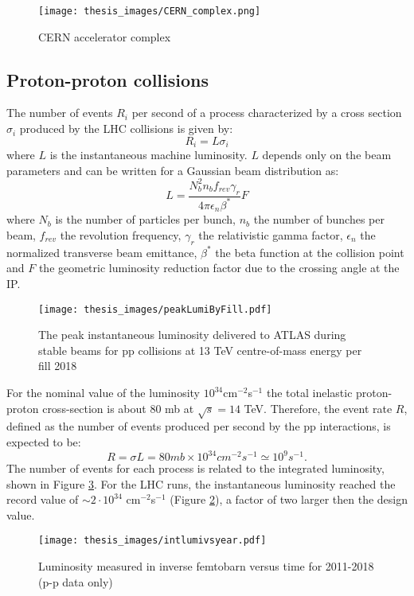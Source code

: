 \documentclass[a4paper, oneside, 11pt, openright]{book}
\begin{document}
				\begin{figure}
					\centering
					\texttt{[image: thesis\_images/CERN\_complex.png]}
					\caption{CERN accelerator complex}
					\label{fig:CERN_complex}
				\end{figure}
			
			\subsection{Proton-proton collisions}
				The number of events $R_{i}$ per second of a process characterized by a cross section $\sigma_{i}$ produced by the LHC collisions is given by:
				$$
				R_{i} = L\sigma_{i}
				$$
				where $L$ is the instantaneous machine luminosity. $L$ depends only on the beam parameters and can be written for a Gaussian beam distribution as: 
				$$
				L = \frac{N_b^2n_bf_{rev}\gamma_r}{4\pi\epsilon_n\beta^*}F
				$$
				where $N_b$ is the number of particles per bunch, $n_b$ the number of bunches per beam, $f_{rev}$ the revolution frequency, $\gamma_r$ the relativistic gamma factor, $\epsilon_n$ the normalized transverse beam emittance, $\beta^*$ the beta function at the collision point and $F$ the geometric luminosity reduction factor due to the crossing angle at the IP. 
				
				\begin{figure}
					\centering
					\texttt{[image: thesis\_images/peakLumiByFill.pdf]}
					\caption{The peak instantaneous luminosity delivered to ATLAS during stable beams for pp collisions at 13 TeV centre-of-mass energy per fill 2018}
					\label{fig:insta lum}
				\end{figure}
				
				For the nominal value of the luminosity $10^{34}$cm$^{-2}$s$^{-1}$ the total inelastic proton-proton cross-section is about 80 mb at $\sqrt{s} = 14$ TeV. Therefore, the event rate $R$, defined as the number of events produced per second by the pp interactions, is expected to be:
				$$
				R = \sigma L = 80 mb\times10^{34}cm^{-2}s^{-1} \simeq 10^{9}s^{-1}.
				$$ 
				The number of events for each process is related to the integrated luminosity, shown in Figure \ref{fig:Integreted Luminosity}. For the LHC runs, the instantaneous luminosity reached the record value of $\sim 2 \cdot 10^{34}$ cm$^{-2}$s$^{-1}$ (Figure \ref{fig:insta lum}), a factor of two larger then the design value.
				
				\begin{figure}
					\centering
					\texttt{[image: thesis\_images/intlumivsyear.pdf]}
					\caption{Luminosity measured in inverse femtobarn versus time for 2011-2018 (p-p data only)}
					\label{fig:Integreted Luminosity}
				\end{figure}
				
\end{document}

